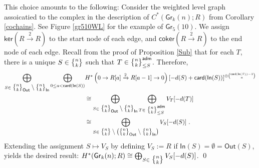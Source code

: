 \documentclass{article}
\newcommand{\bb}[1]{\mathbb{#1}}
\newcommand{\msf}[1]{\mathsf{#1}}
\newcommand{\gr}{\msf{Gr}}
\newcommand{\nchoosek}{\textstyle\genfrac{\lbrace}{\rbrace}{0pt}{}}
\newcommand{\card}{\msf{card}}
\newcommand{\ul}[1]{\underline{#1}}
\newcommand{\In}{\msf{In}}
\newcommand{\Out}{\msf{Out}}
\newcommand{\adm}{\msf{adm}}
\newcommand{\coker}{\msf{coker}}
\renewcommand{\ker}{\msf{ker}}
\newtheorem{conjecture}[theorem]{Conjecture}
\theoremstyle{definition}
\begin{document}
This choice amounts to the following: Consider the weighted level graph assoicatied to the complex in the description of
$C^*(\gr_k(n);R)$ from Corollary \ref{cochains}. See Figure \ref{gr510WL} for the example of $\gr_5(10)$.
We assign $\ker(R\xrightarrow{2}R)$ to the start node of each edge, and $\coker(R\xrightarrow{2}R)$ to the end
node of each edge.
Recall from the proof of Proposition \ref{Sub} that for each $T$, there is a unique $S \in \nchoosek{n}{k}$ such that
$T \in \nchoosek{n}{k}^\adm_{\le S}$. Therefore, 
\begin{align*}
    \bigoplus_{S \in \nchoosek{n}{k}_\Out \setminus \nchoosek{n}{k}_\In}
        \bigoplus_{0 \le a < \card(\In(S))} &H^*\left(0 \to R[a] \xrightarrow{2} R[a-1] \to 0\right)[-d(S)+\card(\In(S))]^{
        \oplus {\card(\In(S))-1 \choose a}} \\
    &\cong \bigoplus_{S \in \nchoosek{n}{k}_\Out \setminus \nchoosek{n}{k}_\In}
        \bigoplus_{T \in \nchoosek{n}{k}^\adm_{\le  S}} V_T[-d(T)] \\
    &\cong \bigoplus_{S \in \nchoosek{n}{k} \setminus\left(\nchoosek{n}{k}_\Out \setminus 
        \nchoosek{n}{k}_\In\right)} V_S[-d(S)]~.
\end{align*}
Extending the assignment $S \mapsto V_S$ by defining $V_S:= R$ if $\In(S)=\emptyset=\Out(S)$, yields the
desired result:
$H^*(\gr_k(n);R) \cong \bigoplus_{S \in \nchoosek{n}{k}} V_S[-d(S)]$.
\qed \\














\end{document}
